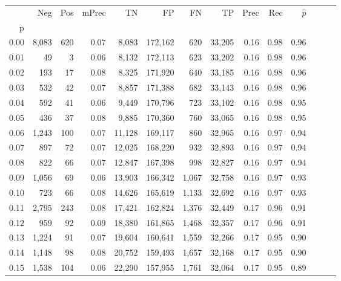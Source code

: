 \begin{tabular}{rrrrrrrrrrrrrr}
\toprule
{} &    Neg &  Pos & mPrec &       TN &       FP &      FN &      TP &  Prec &   Rec & $\hat{p}$ \\
p    &        &      &       &          &          &         &         &       &       &           \\
\midrule
0.00 &  8,083 &  620 &  0.07 &    8,083 &  172,162 &     620 &  33,205 &  0.16 &  0.98 &      0.96 \\
0.01 &     49 &    3 &  0.06 &    8,132 &  172,113 &     623 &  33,202 &  0.16 &  0.98 &      0.96 \\
0.02 &    193 &   17 &  0.08 &    8,325 &  171,920 &     640 &  33,185 &  0.16 &  0.98 &      0.96 \\
0.03 &    532 &   42 &  0.07 &    8,857 &  171,388 &     682 &  33,143 &  0.16 &  0.98 &      0.96 \\
0.04 &    592 &   41 &  0.06 &    9,449 &  170,796 &     723 &  33,102 &  0.16 &  0.98 &      0.95 \\
0.05 &    436 &   37 &  0.08 &    9,885 &  170,360 &     760 &  33,065 &  0.16 &  0.98 &      0.95 \\
0.06 &  1,243 &  100 &  0.07 &   11,128 &  169,117 &     860 &  32,965 &  0.16 &  0.97 &      0.94 \\
0.07 &    897 &   72 &  0.07 &   12,025 &  168,220 &     932 &  32,893 &  0.16 &  0.97 &      0.94 \\
0.08 &    822 &   66 &  0.07 &   12,847 &  167,398 &     998 &  32,827 &  0.16 &  0.97 &      0.94 \\
0.09 &  1,056 &   69 &  0.06 &   13,903 &  166,342 &   1,067 &  32,758 &  0.16 &  0.97 &      0.93 \\
0.10 &    723 &   66 &  0.08 &   14,626 &  165,619 &   1,133 &  32,692 &  0.16 &  0.97 &      0.93 \\
0.11 &  2,795 &  243 &  0.08 &   17,421 &  162,824 &   1,376 &  32,449 &  0.17 &  0.96 &      0.91 \\
0.12 &    959 &   92 &  0.09 &   18,380 &  161,865 &   1,468 &  32,357 &  0.17 &  0.96 &      0.91 \\
0.13 &  1,224 &   91 &  0.07 &   19,604 &  160,641 &   1,559 &  32,266 &  0.17 &  0.95 &      0.90 \\
0.14 &  1,148 &   98 &  0.08 &   20,752 &  159,493 &   1,657 &  32,168 &  0.17 &  0.95 &      0.90 \\
0.15 &  1,538 &  104 &  0.06 &   22,290 &  157,955 &   1,761 &  32,064 &  0.17 &  0.95 &      0.89 \\

\end{tabular}
